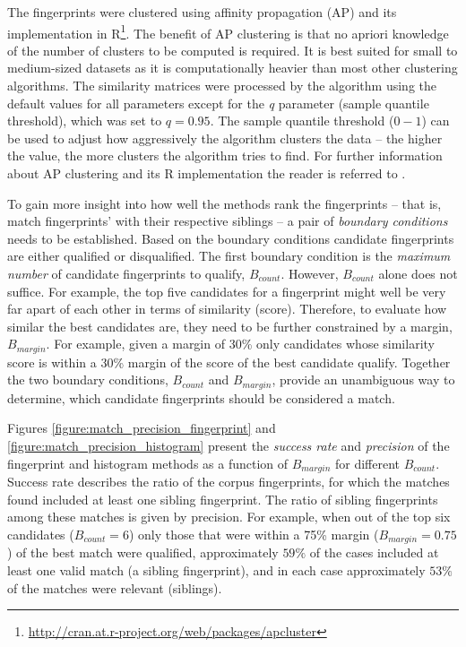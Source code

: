 \documentclass[thesis.tex]{subfiles}
\begin{document}
The fingerprints were clustered using affinity propagation (AP) and its implementation in R\footnote{\url{http://cran.at.r-project.org/web/packages/apcluster}}. The benefit of AP clustering is that no apriori knowledge of the number of clusters to be computed is required. It is best suited for small to medium-sized datasets as it is computationally heavier than most other clustering algorithms. The similarity matrices were processed by the algorithm using the default values for all parameters except for the \emph{q} parameter (sample quantile threshold), which was set to $q=0.95$. The sample quantile threshold ($0-1$) can be used to adjust how aggressively the algorithm clusters the data -- the higher the value, the more clusters the algorithm tries to find. For further information about AP clustering and its R implementation the reader is referred to \cite{affinity_propagation}.

To gain more insight into how well the methods rank the fingerprints -- that is, match fingerprints' with their respective siblings -- a pair of \emph{boundary conditions} needs to be established. Based on the boundary conditions candidate fingerprints are either qualified or disqualified. The first boundary condition is the \emph{maximum number} of candidate fingerprints to qualify, $B_{count}$. However, $B_{count}$ alone does not suffice. For example, the top five candidates for a fingerprint might well be very far apart of each other in terms of similarity (score). Therefore, to evaluate how similar the best candidates are, they need to be further constrained by a margin, $B_{margin}$. For example, given a margin of 30\% only candidates whose similarity score is within a 30\% margin of the score of the best candidate qualify. Together the two boundary conditions, $B_{count}$ and $B_{margin}$, provide an unambiguous way to determine, which candidate fingerprints should be considered a match.

Figures \ref{figure:match_precision_fingerprint} and \ref{figure:match_precision_histogram} present the \emph{success rate} and \emph{precision} of the fingerprint and histogram methods as a function of $B_{margin}$ for different $B_{count}$. Success rate describes the ratio of the corpus fingerprints, for which the matches found included at least one sibling fingerprint. The ratio of sibling fingerprints among these matches is given by precision. For example, when out of the top six candidates ($B_{count}=6$) only those that were within a 75\% margin ($B_{margin}=0.75$) of the best match were qualified, approximately $59\%$ of the cases included at least one valid match (a sibling fingerprint), and in each case approximately $53\%$ of the matches were relevant (siblings).
\end{document}
